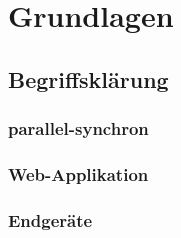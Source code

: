 \documentclass[12pt,a4paper,oneside]{scrbook} %
\newcommand{\tr}[1]{TOREMOVE-->\linebreak{#1} \linebreak <--TOREMOVE}
\renewcommand{\\}{\bigskip}
\begin{document}
\chapter{Grundlagen}
	\section{Begriffsklärung}	
		\subsection{parallel-synchron}
		\subsection{Web-Applikation}
		\subsection{Endgeräte}
\end{document}

